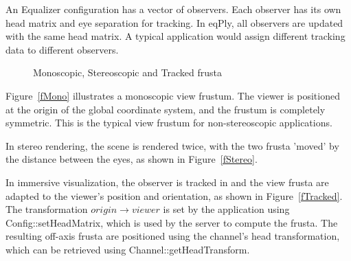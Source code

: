 \documentclass[10pt,a4]{scrartcl}
\newcommand{\fig}[1]{Figure~\ref{#1}}
\begin{document}
An Equalizer configuration has a vector of observers. Each observer has
its own head matrix and eye separation for tracking. In \textsf{eqPly},
all observers are updated with the same head matrix. A typical
application would assign different tracking data to different observers.

\begin{figure}[h!t]
  \hfil
  \hfil
  {\caption{\label{fImmersive}Monoscopic, Stereoscopic and Tracked
    frusta}}
\end{figure}

\fig{fMono} illustrates a monoscopic view frustum. The viewer is
positioned at the origin of the global coordinate system, and the
frustum is completely symmetric. This is the typical view frustum for
non-stereoscopic applications.

In stereo rendering, the scene is rendered twice, with the two frusta
'moved' by the distance between the eyes, as shown in \fig{fStereo}.

In immersive visualization, the observer is tracked in and the view
frusta are adapted to the viewer's position and orientation, as shown
in \fig{fTracked}. The transformation $origin \rightarrow viewer$ is set by
the application using \textsf{Config::setHead\-Matrix}, which is used by
the server to compute the frusta. The resulting off-axis frusta are
positioned using the channel's head transformation, which can be
retrieved using \textsf{Channel::getHeadTransform}.
\end{document}
